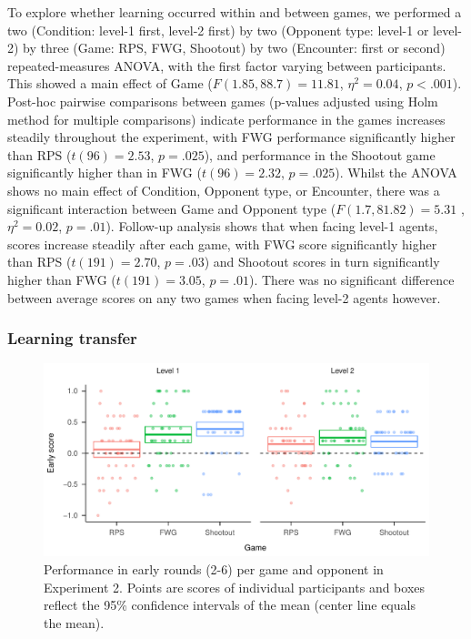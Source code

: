 \documentclass[man,floatsintext]{apa6}
\begin{document}
To explore whether learning occurred within and between games, we performed a two (Condition: level-1 first, level-2 first) by two (Opponent type: level-1 or level-2) by three (Game: RPS, FWG, Shootout) by two (Encounter: first or second) repeated-measures ANOVA, with the first factor varying between participants. This showed a main effect of Game (\(F(1.85,88.7) = 11.81\), \(\eta^{2} = 0.04\), \(p < .001\)). Post-hoc pairwise comparisons between games (p-values adjusted using Holm method for multiple comparisons) indicate performance in the games increases steadily throughout the experiment, with FWG performance significantly higher than RPS (\(t(96) =2.53\), \(p = .025\)), and performance in the Shootout game significantly higher than in FWG (\(t(96) = 2.32\), \(p = .025\)). Whilst the ANOVA shows no main effect of Condition, Opponent type, or Encounter, there was a significant interaction between Game and Opponent type (\(F(1.7, 81.82) = 5.31\) ,\(\eta^{2} = 0.02\), \(p = .01\)). Follow-up analysis shows that when facing level-1 agents, scores increase steadily after each game, with FWG score significantly higher than RPS (\(t(191) = 2.70\), \(p = .03\)) and Shootout scores in turn significantly higher than FWG (\(t(191) = 3.05\), \(p = .01\)). There was no significant difference between average scores on any two games when facing level-2 agents however.

\hypertarget{learning-transfer-1}{%
\subsubsection{Learning transfer}\label{learning-transfer-1}}

\begin{figure}

{\centering \includegraphics{paper_draft_2021_files/figure-latex/exp2-early-score-by-opp-1} 

}

\caption{\label{ref:figure4-caption}Performance in early rounds (2-6) per game and opponent in Experiment 2. Points are scores of individual participants and boxes reflect the 95\% confidence intervals of the mean (center line equals the mean).}\label{fig:exp2-early-score-by-opp}
\end{figure}
\end{document}
